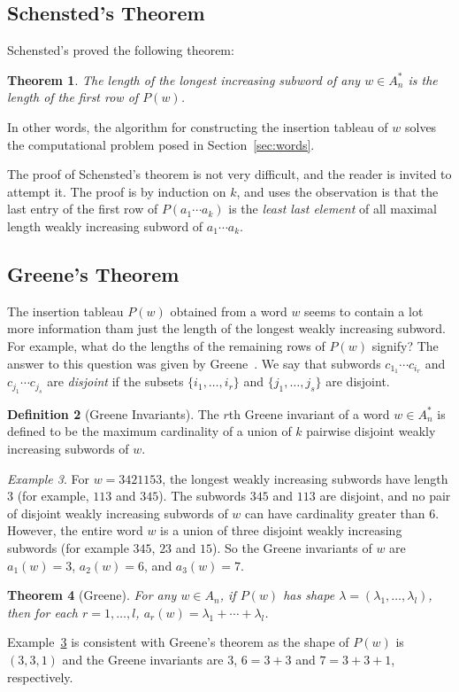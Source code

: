 \documentclass[10pt]{amsproc}
\newtheorem{theorem}{Theorem}[subsection]
\theoremstyle{definition}
\newtheorem{definition}[theorem]{Definition}
\theoremstyle{remark}
\newtheorem{example}[theorem]{Example}
\begin{document}
\subsection{Schensted's Theorem}
\label{sec:schensted-theorem}
Schensted's proved the following theorem:
\begin{theorem}
  The length of the longest increasing subword of any $w\in A_n^*$ is the length of the first row of $P(w)$.
\end{theorem}
In other words, the algorithm for constructing the insertion tableau of $w$ solves the computational problem posed in Section~\ref{sec:words}.

The proof of Schensted's theorem is not very difficult, and the reader is invited to attempt it.
The proof is by induction on $k$, and uses the observation is that the last entry of the first row of $P(a_1\dotsb a_k)$ is the \emph{least last element} of all maximal length weakly increasing subword of $a_1\dotsb a_k$.
\subsection{Greene's Theorem}
\label{sec:greenes-theorem}
The insertion tableau $P(w)$ obtained from a word $w$ seems to contain a lot more information tham just the length of the longest weakly increasing subword.
For example, what do the lengths of the remaining rows of $P(w)$ signify?
The answer to this question was given by Greene~\cite{Greene-schen}.
We say that subwords $c_{1_1}\dotsb c_{i_r}$ and $c_{j_1}\dotsb c_{j_s}$ are \emph{disjoint} if the subsets $\{i_1,\dotsc,i_r\}$ and $\{j_1,\dotsc,j_s\}$ are disjoint.
\begin{definition}
  [Greene Invariants]
  The $r$th Greene invariant of a word $w\in A_n^*$ is defined to be the maximum cardinality of a union of $k$ pairwise disjoint weakly increasing subwords of $w$.
\end{definition}
\begin{example}
  \label{example:greene}
  For $w=3421153$, the longest weakly increasing subwords have length $3$ (for example, $113$ and $345$).
  The subwords $345$ and $113$ are disjoint, and no pair of disjoint weakly increasing subwords of $w$ can have cardinality greater than $6$.
  However, the entire word $w$ is a union of three disjoint weakly increasing subwords (for example $345$, $23$ and $15$).
  So the Greene invariants of $w$ are $a_1(w)=3$, $a_2(w)=6$, and $a_3(w)=7$.
\end{example}
\begin{theorem}
  [Greene]
  \label{theorem:greene}
  For any $w\in A_n$, if $P(w)$ has shape $\lambda=(\lambda_1,\dotsc, \lambda_l)$, then for each $r=1,\dotsc,l$, $a_r(w)=\lambda_1+\dotsb + \lambda_l$.
\end{theorem}
Example~\ref{example:greene} is consistent with Greene's theorem as the shape of $P(w)$ is $(3, 3, 1)$ and the Greene invariants are $3$, $6=3+3$ and $7=3+3+1$, respectively.
\end{document}
